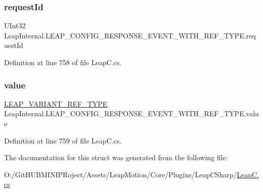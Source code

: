 \subsubsection{\texorpdfstring{requestId}{requestId}}
{\footnotesize\ttfamily U\+Int32 Leap\+Internal.\+L\+E\+A\+P\+\_\+\+C\+O\+N\+F\+I\+G\+\_\+\+R\+E\+S\+P\+O\+N\+S\+E\+\_\+\+E\+V\+E\+N\+T\+\_\+\+W\+I\+T\+H\+\_\+\+R\+E\+F\+\_\+\+T\+Y\+P\+E.\+request\+Id}



Definition at line 758 of file Leap\+C.\+cs.

\mbox{\label{struct_leap_internal_1_1_l_e_a_p___c_o_n_f_i_g___r_e_s_p_o_n_s_e___e_v_e_n_t___w_i_t_h___r_e_f___t_y_p_e_a1b2461e60b8b53f07120c631cff55c81}} 
\subsubsection{\texorpdfstring{value}{value}}
{\footnotesize\ttfamily \mbox{\hyperlink{struct_leap_internal_1_1_l_e_a_p___v_a_r_i_a_n_t___r_e_f___t_y_p_e}{L\+E\+A\+P\+\_\+\+V\+A\+R\+I\+A\+N\+T\+\_\+\+R\+E\+F\+\_\+\+T\+Y\+PE}} Leap\+Internal.\+L\+E\+A\+P\+\_\+\+C\+O\+N\+F\+I\+G\+\_\+\+R\+E\+S\+P\+O\+N\+S\+E\+\_\+\+E\+V\+E\+N\+T\+\_\+\+W\+I\+T\+H\+\_\+\+R\+E\+F\+\_\+\+T\+Y\+P\+E.\+value}



Definition at line 759 of file Leap\+C.\+cs.



The documentation for this struct was generated from the following file\+:\begin{DoxyCompactItemize}
\item 
O\+:/\+Git\+H\+U\+B\+M\+I\+N\+I\+P\+Roject/\+Assets/\+Leap\+Motion/\+Core/\+Plugins/\+Leap\+C\+Sharp/\mbox{\hyperlink{_leap_c_8cs}{Leap\+C.\+cs}}\end{DoxyCompactItemize}
